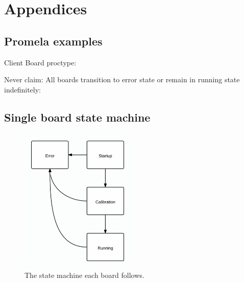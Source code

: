 \section{Appendices}

\subsection{Promela examples}
Client Board proctype:


Never claim: All boards transition to error state
or remain in running state indefinitely:


\subsection{Single board state machine}

\begin{figure}[!ht]
  \caption{The state machine each board follows.}
  \label{states}
  \centering
    \includegraphics[width=0.5\textwidth]{states}
\end{figure}